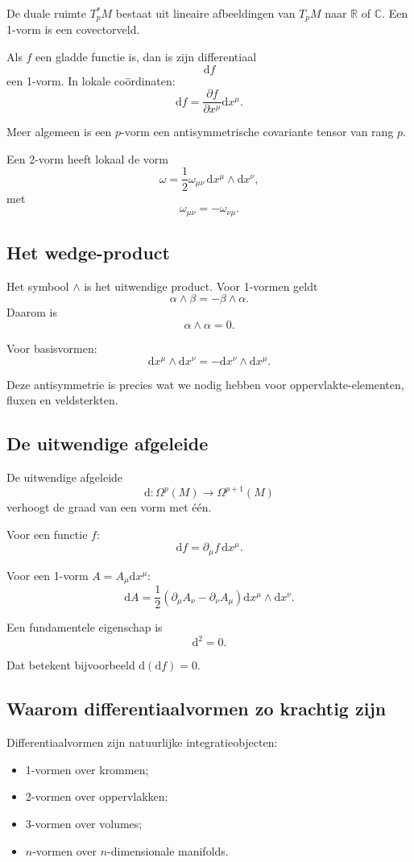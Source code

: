 \documentclass[11pt,a4paper]{article}
\newcommand{\dd}{\mathrm{d}}
\newcommand{\R}{\mathbb{R}}
\newcommand{\C}{\mathbb{C}}
\begin{document}
De duale ruimte $T_p^*M$ bestaat uit lineaire afbeeldingen van $T_pM$ naar $\R$ of $\C$. Een 1-vorm is een covectorveld.

Als $f$ een gladde functie is, dan is zijn differentiaal
\[
\dd f
\]
een 1-vorm. In lokale coördinaten:
\[
\dd f=\frac{\partial f}{\partial x^\mu}\dd x^\mu.
\]

Meer algemeen is een $p$-vorm een antisymmetrische covariante tensor van rang $p$.

Een 2-vorm heeft lokaal de vorm
\[
\omega=\frac12\omega_{\mu\nu}\,\dd x^\mu\wedge\dd x^\nu,
\]
met
\[
\omega_{\mu\nu}=-\omega_{\nu\mu}.
\]

\subsection{Het wedge-product}

Het symbool $\wedge$ is het uitwendige product. Voor 1-vormen geldt
\[
\alpha\wedge\beta=-\beta\wedge\alpha.
\]
Daarom is
\[
\alpha\wedge\alpha=0.
\]

Voor basisvormen:
\[
\dd x^\mu\wedge\dd x^\nu=-\dd x^\nu\wedge\dd x^\mu.
\]

Deze antisymmetrie is precies wat we nodig hebben voor oppervlakte-elementen, fluxen en veldsterkten.

\subsection{De uitwendige afgeleide}

De uitwendige afgeleide
\[
\dd:\Omega^p(M)\to\Omega^{p+1}(M)
\]
verhoogt de graad van een vorm met één.

Voor een functie $f$:
\[
\dd f=\partial_\mu f\,\dd x^\mu.
\]

Voor een 1-vorm $A=A_\mu\dd x^\mu$:
\[
\dd A=\frac12(\partial_\mu A_\nu-\partial_\nu A_\mu)\dd x^\mu\wedge\dd x^\nu.
\]

Een fundamentele eigenschap is
\[
\boxed{\dd^2=0}.
\]

Dat betekent bijvoorbeeld $\dd(\dd f)=0$.

\subsection{Waarom differentiaalvormen zo krachtig zijn}

Differentiaalvormen zijn natuurlijke integratieobjecten:
\begin{itemize}
    \item 1-vormen over krommen;
    \item 2-vormen over oppervlakken;
    \item 3-vormen over volumes;
    \item $n$-vormen over $n$-dimensionale manifolds.
\end{itemize}
\end{document}

